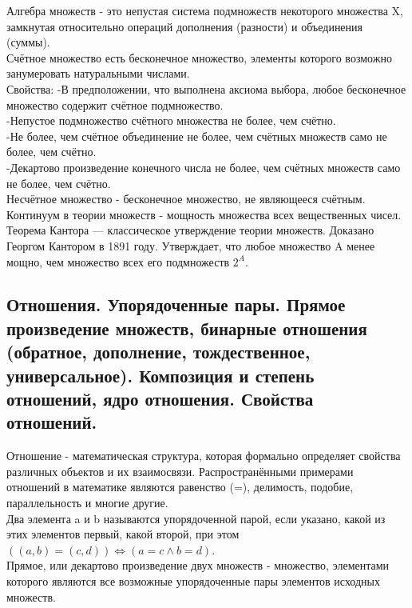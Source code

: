 \documentclass[a4paper, 12pt]{article}
\begin{document}
Алгебра множеств - это непустая система подмножеств некоторого множества X, замкнутая относительно операций дополнения (разности) и объединения (суммы). \\

Счётное множество есть бесконечное множество, элементы которого возможно занумеровать натуральными числами.\\
Свойства:
-В предположении, что выполнена аксиома выбора, любое бесконечное множество содержит счётное подмножество.\\
-Непустое подмножество счётного множества не более, чем счётно.\\
-Не более, чем счётное объединение не более, чем счётных множеств само не более, чем счётно.\\
-Декартово произведение конечного числа не более, чем счётных множеств само не более, чем счётно.\\

Несчётное множество - бесконечное множество, не являющееся счётным. Континуум в теории множеств - мощность множества всех вещественных чисел.\\

Теорема Кантора — классическое утверждение теории множеств. Доказано Георгом Кантором в 1891 году. Утверждает, что любое множество A менее мощно, чем множество всех его подмножеств $ 2^A $. \\

\subsection{Отношения. Упорядоченные пары. Прямое произведение множеств, бинарные отношения (обратное, дополнение, тождественное, универсальное). Композиция и степень отношений, ядро отношения. Свойства отношений.}
Отношение - математическая структура, которая формально определяет свойства различных объектов и их взаимосвязи. Распространёнными примерами отношений в математике являются равенство (=), делимость, подобие, параллельность и многие другие.\\

Два элемента a и b называются упорядоченной парой, если указано, какой из этих элементов первый, какой второй, при этом $ ((a,b) = (c,d)) \Leftrightarrow (a=c \land b=d) $.\\

Прямое, или декартово произведение двух множеств - множество, элементами которого являются все возможные упорядоченные пары элементов исходных множеств.\\
\end{document}
